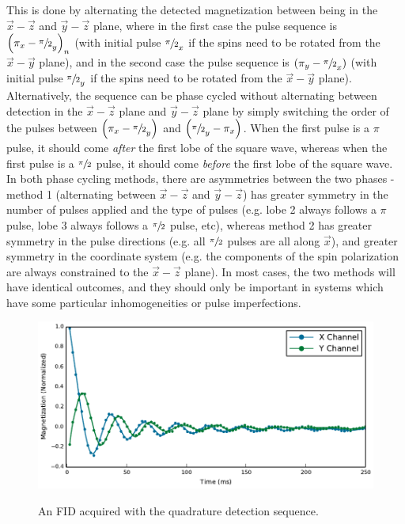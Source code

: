 \documentclass[PaulGanssle-Thesis.tex]{subfiles}
\begin{document}
This is done by alternating the detected magnetization between being in the $\vec{x}-\vec{z}$ and $\vec{y}-\vec{z}$ plane, where in the first case the pulse sequence is $\left(\pi_{x}-\sfrac{\pi}{2}_{y}\right)_{n}$ (with initial pulse $\sfrac{\pi}{2}_{x}$ if the spins need to be rotated from the $\vec{x}-\vec{y}$ plane), and in the second case the pulse sequence is $\left(\pi_{y}-\sfrac{\pi}{2}_{x}\right)$ (with initial pulse $\sfrac{\pi}{2}_{y}$ if the spins need to be rotated from the $\vec{x}-\vec{y}$ plane). Alternatively, the sequence can be phase cycled without alternating between detection in the $\vec{x}-\vec{z}$ plane and $\vec{y}-\vec{z}$ plane by simply switching the order of the pulses between $\left(\pi_{x}-\sfrac{\pi}{2}_{y}\right)$ and $\left(\sfrac{\pi}{2}_{y}-\pi_{x}\right)$. When the first pulse is a $\pi$ pulse, it should come \textit{after} the first lobe of the square wave, whereas when the first pulse is a $\sfrac{\pi}{2}$ pulse, it should come \textit{before} the first lobe of the square wave. In both phase cycling methods, there are asymmetries between the two phases - method 1 (alternating between $\vec{x}-\vec{z}$ and $\vec{y}-\vec{z}$) has greater symmetry in the number of pulses applied and the type of pulses (e.g. lobe 2 always follows a $\pi$ pulse, lobe 3 always follows a $\sfrac{\pi}{2}$ pulse, etc), whereas method 2 has greater symmetry in the pulse directions (e.g. all $\sfrac{\pi}{2}$ pulses are all along $\vec{x}$), and greater symmetry in the coordinate system (e.g. the components of the spin polarization are always constrained to the $\vec{x}-\vec{z}$ plane). In most cases, the two methods will have identical outcomes, and they should only be important in systems which have some particular inhomogeneities or pulse imperfections.

\begin{figure}[ht!]
\includegraphics[width=\tw]{figures/relaxometry/quadrature_fid_data.pdf}
\label{fig:QuadratureDetectedFID}
\caption{An FID acquired with the quadrature detection sequence.}
\end{figure}
\end{document}
